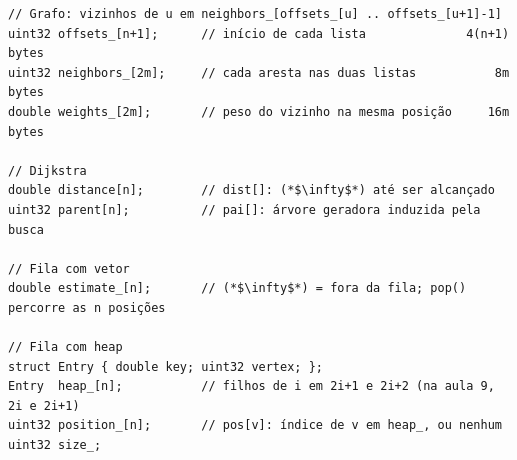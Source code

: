 \documentclass[a4paper,11pt]{article}
\begin{document}
\begin{lstlisting}[float=!htb, caption={Estruturas de dados do grafo e das duas filas de
prioridades (campos simplificados da biblioteca).}, label=lst:estruturas]
// Grafo: vizinhos de u em neighbors_[offsets_[u] .. offsets_[u+1]-1]
uint32 offsets_[n+1];      // início de cada lista              4(n+1) bytes
uint32 neighbors_[2m];     // cada aresta nas duas listas           8m bytes
double weights_[2m];       // peso do vizinho na mesma posição     16m bytes

// Dijkstra
double distance[n];        // dist[]: (*$\infty$*) até ser alcançado
uint32 parent[n];          // pai[]: árvore geradora induzida pela busca

// Fila com vetor
double estimate_[n];       // (*$\infty$*) = fora da fila; pop() percorre as n posições

// Fila com heap
struct Entry { double key; uint32 vertex; };
Entry  heap_[n];           // filhos de i em 2i+1 e 2i+2 (na aula 9, 2i e 2i+1)
uint32 position_[n];       // pos[v]: índice de v em heap_, ou nenhum
uint32 size_;
\end{lstlisting}
\end{document}
